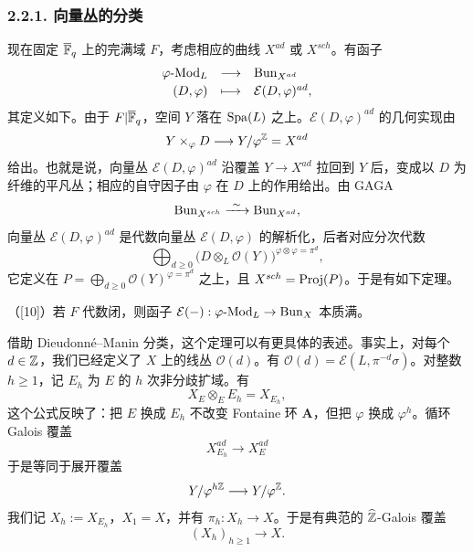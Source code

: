 

\subsubsection*{2.2.1. 向量丛的分类}%

现在固定 $\overline{\mathbb{F}}_q$ 上的完满域 $F$，考虑相应的曲线 $X^{ad}$ 或 $X^{sch}$。有函子
\[
\begin{array}{rcl}
\varphi\text{-}\mathrm{Mod}_L & \longrightarrow & \mathrm{Bun}_{X^{ad}}\\[2pt]
(D,\varphi) & \longmapsto & \mathcal{E}(D,\varphi)^{ad},
\end{array}
\]
其定义如下。由于 $F|\overline{\mathbb{F}}_q$，空间 $Y$ 落在 $\mathrm{Spa}(L)$ 之上。$\mathcal{E}(D,\varphi)^{ad}$ 的几何实现由
\[
Y\times_\varphi D\longrightarrow Y/\varphi^{\mathbb{Z}}=X^{ad}
\]
给出。也就是说，向量丛 $\mathcal{E}(D,\varphi)^{ad}$ 沿覆盖 $Y\to X^{ad}$ 拉回到 $Y$ 后，变成以 $D$ 为纤维的平凡丛；相应的自守因子由 $\varphi$ 在 $D$ 上的作用给出。由 GAGA
\[
\Bun_{X^{sch}}\xrightarrow{\ \sim\ }\Bun_{X^{ad}},
\]
向量丛 $\mathcal{E}(D,\varphi)^{ad}$ 是代数向量丛 $\mathcal{E}(D,\varphi)$ 的解析化，后者对应分次代数
\[
\bigoplus_{d\ge0}\bigl(D\otimes_L\mathcal{O}(Y)\bigr)^{\varphi\otimes\varphi=\pi^d},
\]
它定义在 $P=\bigoplus_{d\ge0}\mathcal{O}(Y)^{\varphi=\pi^d}$ 之上，且 $X^{sch}=\operatorname{Proj}(P)$。于是有如下定理。

\begin{theorem}\label{thm:2.11}
（[10]）若 $F$ 代数闭，则函子 $\mathcal{E}(-):\varphi\text{-}\mathrm{Mod}_L\to \mathrm{Bun}_X$ 本质满。
\end{theorem}

借助 Dieudonné–Manin 分类，这个定理可以有更具体的表述。事实上，对每个 $d\in\mathbb{Z}$，我们已经定义了 $X$ 上的线丛 $\mathcal{O}(d)$。有 $\mathcal{O}(d)=\mathcal{E}(L,\pi^{-d}\sigma)$。对整数 $h\ge1$，记 $E_h$ 为 $E$ 的 $h$ 次非分歧扩域。有
\[
X_E\otimes_E E_h=X_{E_h},
\]
这个公式反映了：把 $E$ 换成 $E_h$ 不改变 Fontaine 环 $\mathbf{A}$，但把 $\varphi$ 换成 $\varphi^h$。循环 Galois 覆盖
\[
X^{ad}_{E_h}\longrightarrow X^{ad}_E
\]
于是等同于展开覆盖
\[
Y/\varphi^{h\mathbb{Z}}\longrightarrow Y/\varphi^{\mathbb{Z}}.
\]
我们记 $X_h:=X_{E_h}$，$X_1=X$，并有 $\pi_h:X_h\to X$。于是有典范的 $\widehat{\mathbb{Z}}$-Galois 覆盖
\[
(X_h)_{h\ge1}\longrightarrow X.
\]

